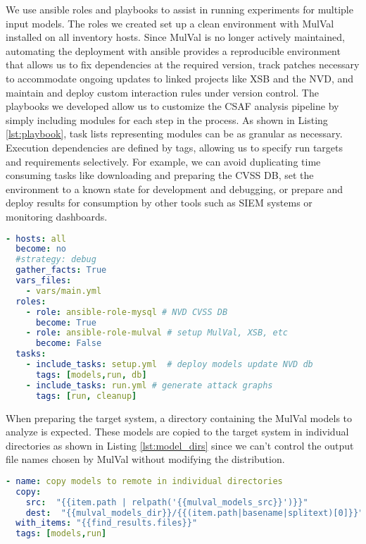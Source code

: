 
We use ansible\cite{Hall:2013:ACM:2601666} roles and playbooks to assist in running experiments for multiple input models. The roles we created set up a clean environment with MulVal installed on all inventory hosts. Since MulVal is no longer actively maintained, automating the deployment with ansible provides a reproducible environment that allows us to fix dependencies at the required version, track patches necessary to accommodate ongoing updates to linked projects like XSB and the NVD, and maintain and deploy custom interaction rules under version control. The playbooks we developed allow us to customize the CSAF analysis pipeline by simply including modules for each step in the process. As shown in Listing \ref{lst:playbook}, task lists representing modules can be as granular as necessary. Execution dependencies are defined by tags, allowing us to specify run targets and requirements selectively. For example, we can avoid duplicating time consuming tasks like downloading and preparing the CVSS DB, set the environment to a known state for development and debugging, or prepare and deploy results for consumption by other tools such as SIEM systems or monitoring dashboards. 


\begin{minipage}{\linewidth}
\begin{lstlisting}[language=yaml, label={lst:playbook}, caption={Ansible CSAF play},captionpos=b, linewidth=.9\textwidth]
- hosts: all
  become: no
  #strategy: debug
  gather_facts: True
  vars_files:
    - vars/main.yml
  roles:
    - role: ansible-role-mysql # NVD CVSS DB
      become: True
    - role: ansible-role-mulval # setup MulVal, XSB, etc
      become: False
  tasks:
    - include_tasks: setup.yml  # deploy models update NVD db
      tags: [models,run, db]
    - include_tasks: run.yml # generate attack graphs
      tags: [run, cleanup]
\end{lstlisting}
\end{minipage}

When preparing the target system, a directory containing the MulVal models to analyze is expected. These models are copied to the target system in individual directories as shown in Listing \ref{lst:model_dirs} since we can't control the output file names chosen by MulVal without modifying the distribution. 
\begin{lstlisting}[language=yaml, label={lst:model_dirs}, caption={MulVal distinct run dirs},captionpos=b, linewidth=.9\textwidth]
- name: copy models to remote in individual directories
  copy:
    src:  "{{item.path | relpath('{{mulval_models_src}}')}}"
    dest:  "{{mulval_models_dir}}/{{(item.path|basename|splitext)[0]}}"
  with_items: "{{find_results.files}}"
  tags: [models,run]
\end{lstlisting}

